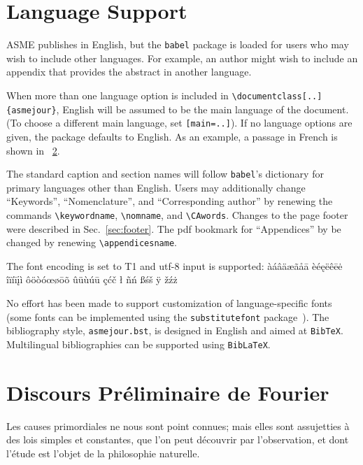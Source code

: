 \documentclass[subscriptcorrection,upint,varvw,mathalfa=cal=euler,barcolor=black,balance,hyphenate,french,pdf-a,nolists]{asmejour}
\begin{document}
\section{Language Support}

ASME publishes in English, but the \texttt{babel} package is loaded for users who may wish to include other languages.
For example, an author might wish to include an appendix that provides the abstract in another language.

When more than one language option is included in \verb|\documentclass[..]{asmejour}|, English will be
assumed to be the main language of the document. (To choose a different main language, set \texttt{[main=..]}).
If no language options are given, the package defaults to English.  As an example, a passage in French is
shown in \appendixname~\ref{app:fourier}.

The standard caption and section names will follow \texttt{babel}'s dictionary for primary languages other than English.  Users may additionally change ``Keywords'', ``Nomenclature'', and  ``Corresponding author'' by renewing the commands \verb|\keywordname|, \verb|\nomname|, and \verb|\CAwords|. Changes to the page footer were described in Sec.~\ref{sec:footer}. The pdf bookmark for ``Appendices'' by be changed by renewing \verb|\appendicesname|.

The font encoding is set to T1 and utf-8 input is supported:
àáâäæãåā  èéęëêēė  îïíīįì ôöòóœøōõ ûüùúū çćč ł ñń ßśš ÿ žźż

No effort has been made to support customization of language-specific fonts (some fonts can be implemented using the \texttt{substitutefont} package~\cite{milde}). The bibliography style, \texttt{asmejour.bst}, is designed in English and aimed at \texttt{BibTeX}.  Multilingual bibliographies can be supported using \texttt{BibLaTeX}.

\section{Discours Préliminaire de Fourier}\label{app:fourier}
Les causes primordiales ne nous sont point con­nues; mais elles sont assujetties à des lois simples et constantes, que l'on peut découvrir par l'obser­vation, et dont l'étude est l'objet de la philosophie naturelle.
\end{document}

